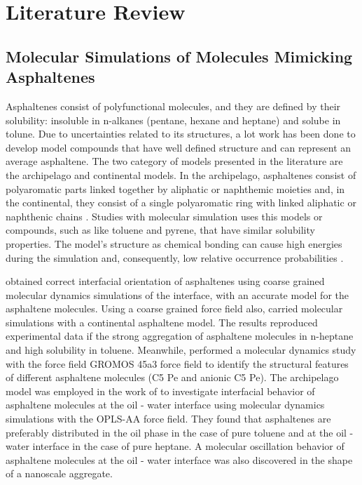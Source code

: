 
\chapter{Literature Review} %

\label{Chapter2} %
\section{Molecular Simulations of Molecules Mimicking Asphaltenes}
Asphaltenes consist of polyfunctional molecules, and they are defined by their solubility: insoluble in n-alkanes (pentane, hexane and heptane) and solube in tolune. Due to uncertainties related to its structures, a lot work has been done to develop model compounds that have well defined structure and can represent an average asphaltene. The two category of models presented in the literature are the archipelago and continental models. In the archipelago, asphaltenes consist of polyaromatic parts linked together by aliphatic or naphthemic moieties and, in the continental, they consist of a single
polyaromatic ring with linked aliphatic or naphthenic chains \cite{doi:10.1021/ef900975e,doi:10.1080/0892702031000148762}. Studies with molecular simulation uses this models or compounds, such as like toluene and pyrene, that have similar solubility properties. The model's structure as chemical bonding  can cause high energies during the simulation and, consequently, low relative occurrence probabilities \cite{doi:10.1021/ef200507c} .   

  obtained correct interfacial orientation of asphaltenes using coarse grained molecular dynamics simulations of the interface, with an accurate model for the asphaltene molecules. Using a coarse grained force field also,  carried molecular simulations with a continental asphaltene model. The results reproduced experimental data if the strong aggregation
of asphaltene molecules in n-heptane and high solubility in toluene. Meanwhile,  performed a molecular
dynamics study with the force field GROMOS 45a3 force field to identify the structural features of different asphaltene molecules (C5 Pe and
anionic C5 Pe). The archipelago model was employed in the work of  to investigate interfacial behavior of asphaltene molecules at the oil - water interface using molecular dynamics simulations with the OPLS-AA force field. They found that  asphaltenes are preferably distributed in the oil phase in the case of pure toluene and at the oil - water interface
in the case of pure heptane. A molecular
oscillation behavior of asphaltene molecules at the oil - water interface was also discovered in the shape of a nanoscale aggregate.

